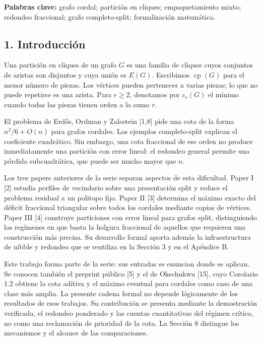 \documentclass[spanish,11pt,a4paper]{article}
\begin{document}
\textbf{Palabras clave:} grafo cordal; partición en cliques; empaquetamiento mixto; redondeo fraccional; grafo completo-split; formalización matemática.

\subsection{1. Introducción}\label{introducciuxf3n}

Una partición en cliques de un grafo \(G\) es una familia de cliques cuyos conjuntos de aristas son disjuntos y cuya unión es \(E(G)\). Escribimos \(\operatorname{cp}(G)\) para el menor número de piezas. Los vértices pueden pertenecer a varias piezas; lo que no puede repetirse es una arista. Para \(r\ge2\), denotamos por \(c_r(G)\) el mínimo cuando todas las piezas tienen orden a lo sumo \(r\).

El problema de Erdős, Ordman y Zalcstein {[}1,8{]} pide una cota de la forma \(n^2/6+O(n)\) para grafos cordales. Los ejemplos completo-split explican el coeficiente cuadrático. Sin embargo, una cota fraccional de ese orden no produce inmediatamente una partición con error lineal: el redondeo general permite una pérdida subcuadrática, que puede ser mucho mayor que \(n\).

Los tres papers anteriores de la serie separan aspectos de esta dificultad. Paper I {[}2{]} estudia perfiles de vecindario sobre una presentación split y reduce el problema residual a un politopo fijo. Paper II {[}3{]} determina el máximo exacto del déficit fraccional triangular sobre todos los cordales mediante copias de vértices. Paper III {[}4{]} construye particiones con error lineal para grafos split, distinguiendo los regímenes en que basta la holgura fraccional de aquellos que requieren una construcción más precisa. Su desarrollo formal aporta además la infraestructura de nibble y redondeo que se reutiliza en la Sección 3 y en el Apéndice B.

Este trabajo forma parte de la serie: sus entradas se enuncian donde se aplican. Se conocen también el preprint público {[}5{]} y el de Okechukwu {[}15{]}, cuyo Corolario 1.2 obtiene la cota aditiva y el máximo eventual para cordales como caso de una clase más amplia. La presente cadena formal no depende lógicamente de los resultados de esos trabajos. Su contribución se presenta mediante la demostración verificada, el redondeo ponderado y las cuentas cuantitativas del régimen crítico, no como una reclamación de prioridad de la cota. La Sección 8 distingue los mecanismos y el alcance de las comparaciones.
\end{document}
